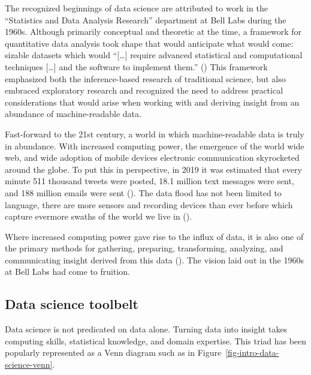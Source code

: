 \documentclass[
  letterpaper,
]{latex/krantz}
\theoremstyle{definition}
\theoremstyle{remark}
\begin{document}
The recognized beginnings of data science are attributed to work in the
``Statistics and Data Analysis Research'' department at Bell Labs during
the 1960s. Although primarily conceptual and theoretic at the time, a
framework for quantitative data analysis took shape that would
anticipate what would come: sizable datasets which would ``{[}\ldots{]}
require advanced statistical and computational techniques {[}\ldots{]}
and the software to implement them.''
() This framework emphasized
both the inference-based research of traditional science, but also
embraced exploratory research and recognized the need to address
practical considerations that would arise when working with and deriving
insight from an abundance of machine-readable data.

Fast-forward to the 21st century, a world in which machine-readable data
is truly in abundance. With increased computing power, the emergence of
the world wide web, and wide adoption of mobile devices electronic
communication skyrocketed around the globe. To put this in perspective,
in 2019 it was estimated that every minute 511 thousand tweets were
posted, 18.1 million text messages were sent, and 188 million emails
were sent (). The data flood has not been limited to
language, there are more sensors and recording devices than ever before
which capture evermore swaths of the world we live in
().

Where increased computing power gave rise to the influx of data, it is
also one of the primary methods for gathering, preparing, transforming,
analyzing, and communicating insight derived from this data
(). The vision laid out in the
1960s at Bell Labs had come to fruition.

\subsection{Data science toolbelt}\label{data-science-toolbelt}

Data science is not predicated on data alone. Turning data into insight
takes computing skills, statistical knowledge, and domain expertise.
This triad has been popularly represented as a Venn diagram such as in
Figure~\ref{fig-intro-data-science-venn}.
\end{document}

